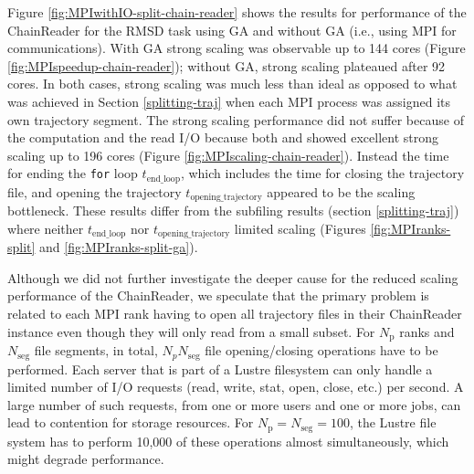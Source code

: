 Figure \ref{fig:MPIwithIO-split-chain-reader} shows the results for performance of the ChainReader for the RMSD task using GA and without GA (i.e., using MPI for communications). 
With GA strong scaling was observable up to 144 cores (Figure \ref{fig:MPIspeedup-chain-reader}); without GA, strong scaling plateaued after 92 cores.
In both cases, strong scaling was much less than ideal as opposed to what was achieved in Section \ref{splitting-traj} when each MPI process was assigned its own trajectory segment. 
The strong scaling performance did not suffer because of the computation and the read I/O because both \tcomp and \tIO showed excellent strong scaling up to 196 cores (Figure \ref{fig:MPIscaling-chain-reader}).
Instead the time for ending the \texttt{for} loop $t_{\text{end\_loop}}$, which includes the time for closing the trajectory file, and opening the trajectory $t_{\text{opening\_trajectory}}$ appeared to be the scaling bottleneck.
These results differ from the subfiling results (section \ref{splitting-traj}) where neither $t_{\text{end\_loop}}$ nor $t_{\text{opening\_trajectory}}$ limited scaling (Figures \ref{fig:MPIranks-split} and \ref{fig:MPIranks-split-ga}). 

Although we did not further investigate the deeper cause for the reduced scaling performance of the ChainReader, we speculate that the primary problem is related to each MPI rank having to open all trajectory files in their ChainReader instance even though they will only read from a small subset.
For $N_{\text{p}}$ ranks and $N_{\text{seg}}$ file segments, in total, $N_{p } N_{\text{seg}}$ file opening/closing operations have to be performed. 
Each server that is part of a Lustre filesystem can only handle a limited number of I/O requests (read, write, stat, open, close, etc.) per second.
A large number of such requests, from one or more users and one or more jobs, can lead to contention for storage resources. 
For $N_{\text{p}} = N_{\text{seg}} = 100$, the Lustre file system has to perform 10,000 of these operations almost simultaneously, which might degrade performance. 


